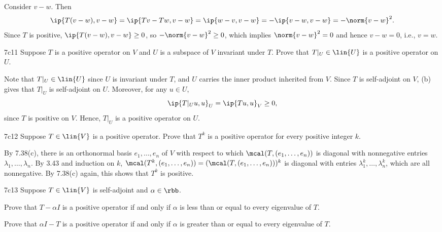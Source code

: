 \begin{sol}
    Consider $v - w$.
    Then
    \[
        \ip{T(v - w), v - w} = \ip{Tv - Tw, v - w} = \ip{w - v, v - w} = -\ip{v - w, v - w} = -\norm{v - w}^2.
    \]
    Since $T$ is positive, $\ip{T(v - w), v - w} \geq 0$, so $-\norm{v - w}^2 \geq 0$, which implies $\norm{v - w}^2 = 0$ and hence $v - w = 0$, i.e., $v = w$.
\end{sol}

\begin{exercise}{7c11}
    Suppose $T$ is a positive operator on $V$ and $U$ is a subspace of $V$ invariant under $T$.
    Prove that $T|_U \in \lin{U}$ is a positive operator on $U$.
\end{exercise}

\begin{sol}
    Note that $T|_U \in \lin{U}$ since $U$ is invariant under $T$, and $U$ carries the inner product inherited from $V$.
    Since $T$ is self-adjoint on $V$, (b) gives that $T|_U$ is self-adjoint on $U$.
    Moreover, for any $u \in U$,
    \[
        \ip{T|_U u, u}_U = \ip{Tu, u}_V \geq 0,
    \]
    since $T$ is positive on $V$.
    Hence, $T|_U$ is a positive operator on $U$.
\end{sol}

\begin{exercise}{7c12}
    Suppose $T \in \lin{V}$ is a positive operator.
    Prove that $T^k$ is a positive operator for every positive integer $k$.
\end{exercise}

\begin{sol}
    By 7.38(c), there is an orthonormal basis $e_1, \ldots, e_n$ of $V$ with respect to which $\mcal(T, (e_1, \ldots, e_n))$ is diagonal with nonnegative entries $\lambda_1, \ldots, \lambda_n$.
    By 3.43 and induction on $k$, $\mcal(T^k, (e_1, \ldots, e_n)) = (\mcal(T, (e_1, \ldots, e_n)))^k$ is diagonal with entries $\lambda_1^k, \ldots, \lambda_n^k$, which are all nonnegative.
    By 7.38(c) again, this shows that $T^k$ is positive.
\end{sol}

\begin{exercise}{7c13}
    Suppose $T \in \lin{V}$ is self-adjoint and $\alpha \in \rbb$.
    \begin{subexercises}
        \item Prove that $T - \alpha I$ is a positive operator if and only if $\alpha$ is less than or equal to every eigenvalue of $T$.
        \item Prove that $\alpha I - T$ is a positive operator if and only if $\alpha$ is greater than or equal to every eigenvalue of $T$.
    \end{subexercises}
\end{exercise}

